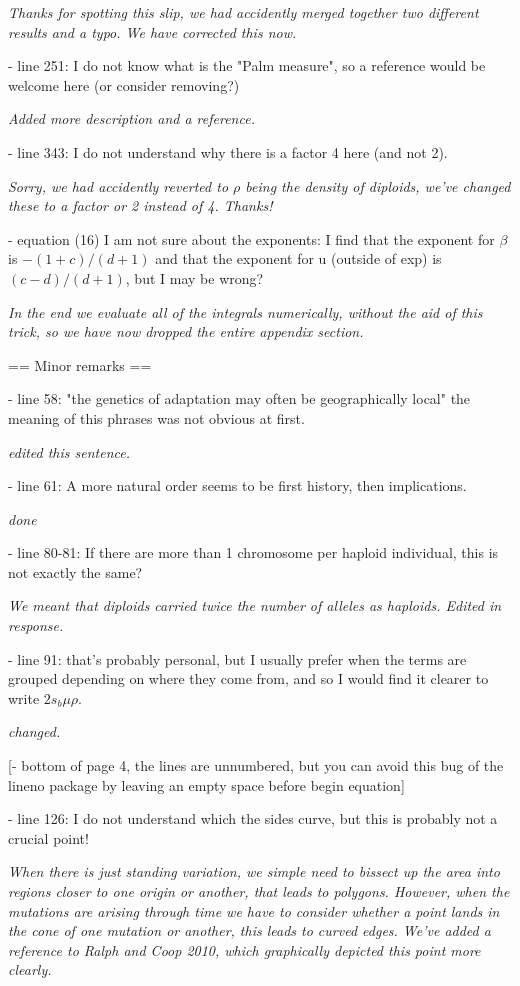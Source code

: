 \documentclass[12pt,letterpaper]{article}
\newcommand{\response}[1]{\emph{ \color{blue} #1}}
\begin{document}
\response{Thanks for spotting this slip, we had accidently merged together two different results and a typo. We have corrected this now.}

- line 251: I do not know what is the "Palm measure", so a reference would be welcome here (or consider removing?)

\response{Added more description and a reference.}

- line 343: I do not understand why there is a factor 4 here (and not 2).

\response{Sorry, we had accidently reverted to $\rho$ being the density of diploids, we've changed these to a factor or 2 instead of 4. Thanks! }

- equation (16) I am not sure about the exponents: I find that the exponent for $\beta$ is $-(1+c)/(d+1)$ and that the exponent for u (outside of exp) is $(c-d)/(d+1)$, but I may be wrong?

\response{In the end we evaluate all of the integrals numerically, without the aid of this trick, so we have now dropped the entire appendix section.}

== Minor remarks ==

- line 58: "the genetics of adaptation may often be geographically local" the meaning of this phrases was not obvious at first.

\response{edited this sentence.}

- line 61: A more natural order seems to be first history, then implications.

\response{done}

- line 80-81: If there are more than 1 chromosome per haploid individual, this is not exactly the same?

\response{We meant that diploids carried twice the number of alleles as haploids. Edited in response.}

- line 91: that's probably personal, but I usually prefer when the terms are grouped depending on where they come from, and so I would find it clearer to write $2 s_b \mu \rho$.

\response{changed.}

[- bottom of page 4, the lines are unnumbered, but you can avoid this bug of the lineno package by leaving an empty space before begin equation]

- line 126: I do not understand which the sides curve, but this is probably not a crucial point!

\response{When there is just standing variation, we simple need to bissect up the area into regions closer to one origin or another, that leads to polygons. However, when the mutations are arising through time we have to consider whether a point lands in the cone of one mutation or another, this leads to curved edges. We've added a reference to Ralph and Coop 2010, which graphically depicted this point more clearly.}
\end{document}
